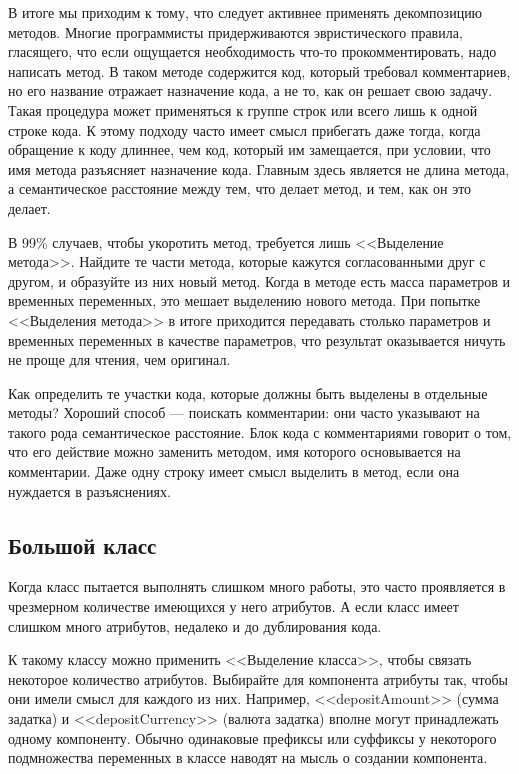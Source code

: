 \documentclass{../../text-style}
\begin{document}
В итоге мы приходим к тому, что следует активнее применять декомпозицию методов. Многие программисты придерживаются эвристического правила, гласящего, что если ощущается необходимость что-то прокомментировать, надо написать метод. В таком методе содержится код, который требовал комментариев, но его название отражает назначение кода, а не то, как он решает свою задачу. Такая процедура может применяться к группе строк или всего лишь к одной строке кода. К этому подходу часто имеет смысл прибегать даже тогда, когда обращение к коду длиннее, чем код, который им замещается, при условии, что имя метода разъясняет назначение кода. Главным здесь является не длина метода, а семантическое расстояние между тем, что делает метод, и тем, как он это делает.

В 99\% случаев, чтобы укоротить метод, требуется лишь <<Выделение метода>>. Найдите те части метода, которые кажутся согласованными друг с другом, и образуйте из них новый метод. Когда в методе есть масса параметров и временных переменных, это мешает выделению нового метода. При попытке <<Выделения метода>> в итоге приходится передавать столько параметров и временных переменных в качестве параметров, что результат оказывается ничуть не проще для чтения, чем оригинал.

Как определить те участки кода, которые должны быть выделены в отдельные методы? Хороший способ --- поискать комментарии: они часто указывают на такого рода семантическое расстояние. Блок кода с комментариями говорит о том, что его действие можно заменить методом, имя которого основывается на комментарии. Даже одну строку имеет смысл выделить в метод, если она нуждается в разъяснениях.

\subsection{Большой класс}

Когда класс пытается выполнять слишком много работы, это часто проявляется в чрезмерном количестве имеющихся у него атрибутов. А если класс имеет слишком много атрибутов, недалеко и до дублирования кода.

К такому классу можно применить <<Выделение класса>>, чтобы связать некоторое количество атрибутов. Выбирайте для компонента атрибуты так, чтобы они имели смысл для каждого из них. Например, <<depositAmount>> (сумма задатка) и <<depositCurrency>> (валюта задатка) вполне могут принадлежать одному компоненту. Обычно одинаковые префиксы или суффиксы у некоторого подмножества переменных в классе наводят на мысль о создании компонента. 
\end{document}

